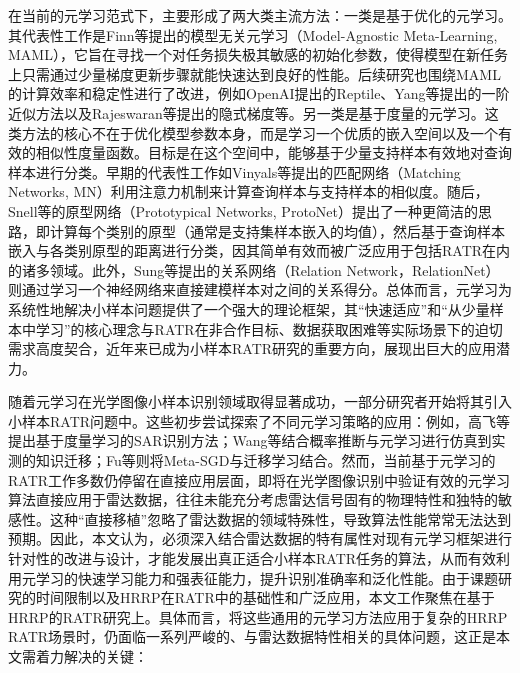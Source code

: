 在当前的元学习范式下，主要形成了两大类主流方法：一类是基于优化的元学习。其代表性工作是Finn等提出的模型无关元学习（Model-Agnostic Meta-Learning, MAML），它旨在寻找一个对任务损失极其敏感的初始化参数，使得模型在新任务上只需通过少量梯度更新步骤就能快速达到良好的性能。后续研究也围绕MAML的计算效率和稳定性进行了改进，例如OpenAI提出的Reptile、Yang等提出的一阶近似方法以及Rajeswaran等提出的隐式梯度等。另一类是基于度量的元学习。这类方法的核心不在于优化模型参数本身，而是学习一个优质的嵌入空间以及一个有效的相似性度量函数。目标是在这个空间中，能够基于少量支持样本有效地对查询样本进行分类。早期的代表性工作如Vinyals等提出的匹配网络（Matching Networks, MN）利用注意力机制来计算查询样本与支持样本的相似度。随后，Snell等的原型网络（Prototypical Networks, ProtoNet）提出了一种更简洁的思路，即计算每个类别的原型（通常是支持集样本嵌入的均值），然后基于查询样本嵌入与各类别原型的距离进行分类，因其简单有效而被广泛应用于包括RATR在内的诸多领域。此外，Sung等提出的关系网络（Relation Network，RelationNet）则通过学习一个神经网络来直接建模样本对之间的关系得分。总体而言，元学习为系统性地解决小样本问题提供了一个强大的理论框架，其“快速适应”和“从少量样本中学习”的核心理念与RATR在非合作目标、数据获取困难等实际场景下的迫切需求高度契合，近年来已成为小样本RATR研究的重要方向，展现出巨大的应用潜力。

随着元学习在光学图像小样本识别领域取得显著成功，一部分研究者开始将其引入小样本RATR问题中。这些初步尝试探索了不同元学习策略的应用：例如，高飞等提出基于度量学习的SAR识别方法；Wang等结合概率推断与元学习进行仿真到实测的知识迁移；Fu等则将Meta-SGD与迁移学习结合。然而，当前基于元学习的RATR工作多数仍停留在直接应用层面，即将在光学图像识别中验证有效的元学习算法直接应用于雷达数据，往往未能充分考虑雷达信号固有的物理特性和独特的敏感性。这种“直接移植”忽略了雷达数据的领域特殊性，导致算法性能常常无法达到预期。因此，本文认为，必须深入结合雷达数据的特有属性对现有元学习框架进行针对性的改进与设计，才能发展出真正适合小样本RATR任务的算法，从而有效利用元学习的快速学习能力和强表征能力，提升识别准确率和泛化性能。由于课题研究的时间限制以及HRRP在RATR中的基础性和广泛应用，本文工作聚焦在基于HRRP的RATR研究上。具体而言，将这些通用的元学习方法应用于复杂的HRRP RATR场景时，仍面临一系列严峻的、与雷达数据特性相关的具体问题，这正是本文需着力解决的关键：

